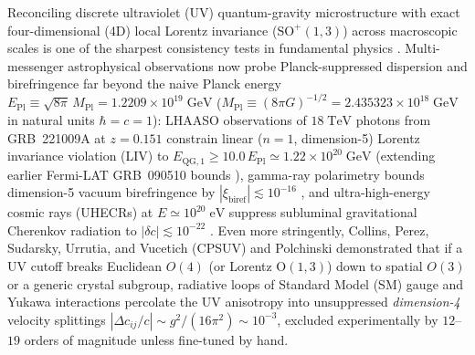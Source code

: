 \documentclass[11pt,a4paper]{article}
\begin{document}
Reconciling discrete ultraviolet (UV) quantum-gravity microstructure with exact four-dimensional (4D) local Lorentz invariance ($\mathrm{SO}^+(1,3)$) across macroscopic scales is one of the sharpest consistency tests in fundamental physics \cite{Liberati2013,KosteleckyMewes2002,Addazi2022}. Multi-messenger astrophysical observations now probe Planck-suppressed dispersion and birefringence far beyond the naive Planck energy $E_{\mathrm{Pl}} \equiv \sqrt{8\pi}\,M_{\mathrm{Pl}} = 1.2209\times 10^{19}\;\mathrm{GeV}$ ($M_{\mathrm{Pl}} \equiv (8\pi G)^{-1/2} = 2.435323\times 10^{18}\;\mathrm{GeV}$ in natural units $\hbar = c = 1$): LHAASO observations of $18\;\mathrm{TeV}$ photons from GRB~221009A at $z = 0.151$ constrain linear ($n=1$, dimension-5) Lorentz invariance violation (LIV) to $E_{\mathrm{QG},1} \ge 10.0\,E_{\mathrm{Pl}} \simeq 1.22\times 10^{20}\;\mathrm{GeV}$ \cite{LHAASO2024LIV} (extending earlier Fermi-LAT GRB~090510 bounds \cite{Abdo2009GRB090510}), gamma-ray polarimetry bounds dimension-5 vacuum birefringence by $|\xi_{\mathrm{biref}}| \lesssim 10^{-16}$ \cite{Liberati2013}, and ultra-high-energy cosmic rays (UHECRs) at $E \simeq 10^{20}\;\mathrm{eV}$ suppress subluminal gravitational Cherenkov radiation to $|\delta c| \lesssim 10^{-22}$ \cite{ElliottMooreStoica2005}. Even more stringently, Collins, Perez, Sudarsky, Urrutia, and Vucetich (CPSUV) \cite{CPSUV2004} and Polchinski \cite{Polchinski2012} demonstrated that if a UV cutoff breaks Euclidean $O(4)$ (or Lorentz $\mathrm{O}(1,3)$) down to spatial $O(3)$ or a generic crystal subgroup, radiative loops of Standard Model (SM) gauge and Yukawa interactions percolate the UV anisotropy into unsuppressed \emph{dimension-4} velocity splittings $|\Delta c_{ij}/c| \sim g^2/(16\pi^2) \sim 10^{-3}$, excluded experimentally by $12$--$19$ orders of magnitude unless fine-tuned by hand.
\end{document}
